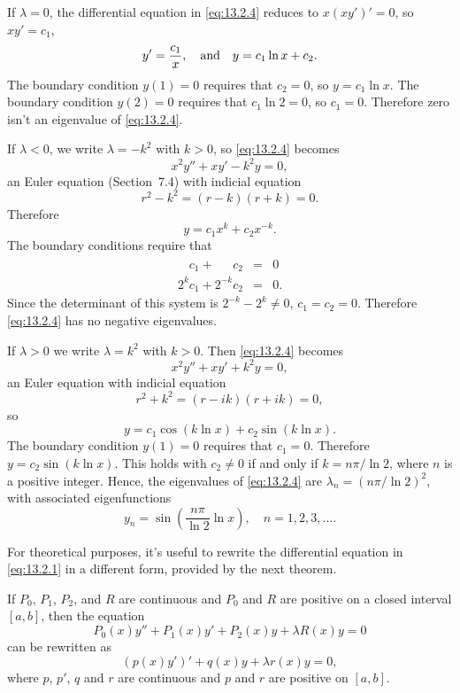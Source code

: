 \begin{examplesolution}
\solution If $\lambda=0$, the differential equation in \eqref{eq:13.2.4} reduces to $x(xy')'=0$, so
$xy'=c_{1}$,
\[
  y'=\frac{c_{1}}{x},\text{\quad and\quad}y=c_{1}\ln x+c_{2}.
\]
The boundary condition $y(1)=0$ requires that $c_{2}=0$, so $y=c_{1}\ln x$. The boundary condition
$y(2)=0$ requires that $c_{1}\ln2=0$, so $c_{1}=0$. Therefore zero isn't an eigenvalue of
\eqref{eq:13.2.4}.

If $\lambda<0$, we write $\lambda=-k^{2}$ with $k>0$, so \eqref{eq:13.2.4} becomes
\[
  x^{2}y''+xy'-k^{2}y=0,
\]
an Euler equation (Section~7.4) with indicial equation
\[
  r^{2}-k^{2}=(r-k)(r+k)=0.
\]
Therefore
\[
  y=c_{1}x^{k}+c_{2}x^{-k}.
\]
The boundary conditions require that
\begin{eqnarray*}
  \phantom{2^{k}}c_{1}+\phantom{2^{-k}}c_{2} & = & 0 \\
  2^{k}c_{1}+2^{-k}c_{2}                     & = & 0.
\end{eqnarray*}
Since the determinant of this system is $2^{-k}-2^{k}\ne0$, $c_{1}=c_{2}=0$. Therefore
\eqref{eq:13.2.4} has no negative eigenvalues.

If $\lambda>0$ we write $\lambda=k^{2}$ with $k>0$. Then \eqref{eq:13.2.4} becomes
\[
  x^{2}y''+xy'+k^{2}y=0,
\]
an Euler equation with indicial equation
\[
  r^{2}+k^{2}=(r-ik)(r+ik)=0,
\]
so
\[
  y=c_{1}\cos(k\ln x)+c_{2}\sin(k\ln x).
\]
The boundary condition $y(1)=0$ requires that $c_{1}=0$. Therefore $y=c_{2}\sin(k\ln x)$. This holds
with $c_{2}\ne0$ if and only if $k=n\pi/\ln2$, where $n$ is a positive integer. Hence, the
eigenvalues of \eqref{eq:13.2.4} are $\lambda_{n}=(n\pi/\ln2)^{2}$, with associated eigenfunctions
\[
  y_{n}=\sin\left(\frac{n\pi}{\ln2}\ln x\right),\quad n=1,2,3,\dots.
\]
\end{examplesolution}

For theoretical purposes, it's useful to rewrite the differential equation in \eqref{eq:13.2.1} in a
different form, provided by the next theorem.

\begin{theorem}
  \color{blue}
  \label{thmtype:13.2.1} If $P_{0}$, $P_{1}$, $P_{2}$, and $R$ are continuous and $P_{0}$ and $R$
  are positive on a closed interval $[a,b]$, then the equation
  \begin{equation}
    \label{eq:13.2.5}P_{0}(x)y''+P_{1}(x)y'+P_{2}(x)y+\lambda R(x)y=0
  \end{equation}
  can be rewritten as
  \begin{equation}
    \label{eq:13.2.6}(p(x)y')'+q(x)y+\lambda r(x)y=0,
  \end{equation}
  where $p$, $p'$, $q$ and $r$ are continuous and $p$ and $r$ are positive on $[a,b]$.
\end{theorem}

